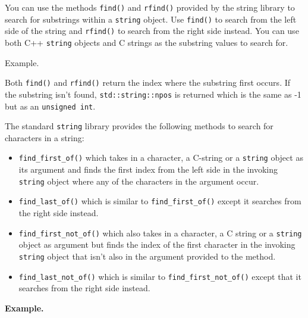 \newpage{}

You can use the methods \texttt{find()} and \texttt{rfind()} provided by the
string library to search for substrings within a \texttt{string} object.
Use \texttt{find()} to search from the left side of the string and
\texttt{rfind()} to search from the right side instead. You can use both
C++ \texttt{string} objects and C strings as the substring values to
search for.

Example.


Both \texttt{find()} and \texttt{rfind()} return the index where the
substring first occurs. If the substring isn't found,
\texttt{std::string::npos} is returned which is the same as -1 but as an
\texttt{unsigned int}.

\newpage{}

The standard \texttt{string} library provides the following methods to
search for characters in a string:

\begin{itemize}
\item
  \texttt{find_first_of()} which takes in a character, a C-string or a
  \texttt{string} object as its argument and finds the first index from
  the left side in the invoking \texttt{string} object where any of the
  characters in the argument occur.
\item
  \texttt{find_last_of()} which is similar to \texttt{find_first_of()}
  except it searches from the right side instead.
\item
  \texttt{find_first_not_of()} which also takes in a character, a C
  string or a \texttt{string} object as argument but finds the index of
  the first character in the invoking \texttt{string} object that
  isn't also in the argument provided to the method.
\item
  \texttt{find_last_not_of()} which is similar to
  \texttt{find_first_not_of()} except that it searches from the right
  side instead.
\end{itemize}

\textbf{Example.}

